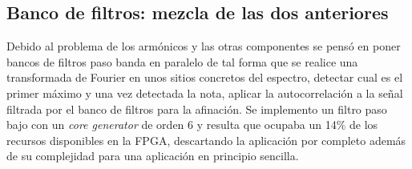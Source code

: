 	
	\subsection{Banco de filtros: mezcla de las dos anteriores}
	Debido al problema de los armónicos y las otras componentes se pensó en poner bancos de filtros paso banda en paralelo de tal forma que se realice una transformada de Fourier en unos sitios concretos del espectro, detectar cual es el primer máximo y una vez detectada la nota, aplicar la autocorrelación a la señal filtrada por el banco de filtros para la afinación.
	Se implemento un filtro paso bajo con un \emph{core generator} de orden 6 y resulta que ocupaba un 14$\%$ de los recursos disponibles en la FPGA, descartando la aplicación por completo además de su complejidad para una aplicación en principio sencilla.
	



